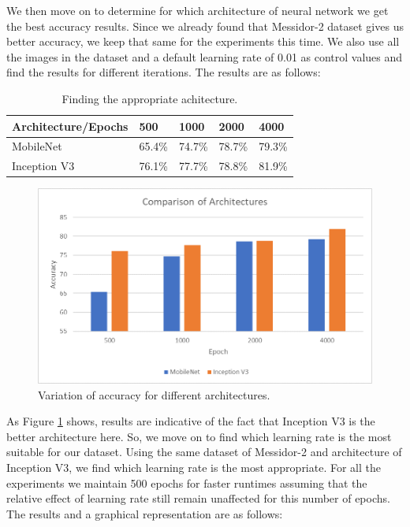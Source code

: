 \documentclass[12pt]{report}
\begin{document}
\noindent We then move on to determine for which architecture of neural network we get the best accuracy results. Since we already found that Messidor-2 dataset gives us better accuracy, we keep that same for the experiments this time. We also use all the images in the dataset and a default learning rate of 0.01 as control values and find the results for different iterations. The results are as follows: 

\begin{table}[H]
\begin{center}
\begin{tabular}{ |p{5cm}|p{2cm}|p{2cm}|p{2cm}|p{2cm}| }
 \hline
 Architecture/Epochs & 500 & 1000 & 2000 & 4000\\ 
 \hline
 MobileNet &  65.4\% & 74.7\% &  78.7\% & 79.3\% \\  
 \hline
 Inception V3 & 76.1\% &  77.7\% &  78.8\% &  81.9\%\\   
 \hline
\end{tabular}
\caption{Finding the appropriate achitecture.}
\end{center}
\end{table}

\begin{figure}[h]
\centering
\includegraphics[width=1\textwidth]{Paint1}
\caption{Variation of accuracy for different architectures.}
\label{fig:test9}
\end{figure}

\noindent As Figure \ref{fig:test9} shows, results are indicative of the fact that Inception V3 is the better architecture here. So, we move on to find which learning rate is the most suitable for our dataset. Using the same dataset of Messidor-2 and architecture of Inception V3, we find which learning rate is the most appropriate. For all the experiments we maintain 500 epochs for faster runtimes assuming that the relative effect of learning rate still remain unaffected for this number of epochs. The results and a graphical representation are as follows:
\end{document}
